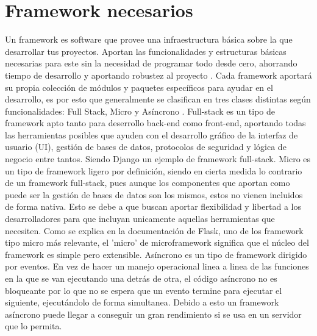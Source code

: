 \section{Framework necesarios}
Un framework es software que provee una infraestructura básica sobre la que desarrollar tus proyectos. Aportan las funcionalidades y estructuras básicas necesarias para este sin la necesidad de programar todo desde cero, ahorrando tiempo de desarrollo y aportando robustez al proyecto \cite{ghimire2020comparative}.
\newline
\newline
Cada framework aportará su propia colección de módulos y paquetes específicos para ayudar en el desarrollo, es por esto que generalmente se clasifican en tres clases distintas según funcionalidades: Full Stack, Micro y Asíncrono \cite{WebFra}.\newline
\newline
Full-stack es un tipo de framework apto tanto para deserrollo back-end como front-end, aportando todas las herramientas posibles que ayuden con el desarrollo gráfico de la interfaz de usuario (UI), gestión de bases de datos, protocolos de seguridad y lógica de negocio entre tantos. Siendo Django un ejemplo de framework full-stack. 
\newline
\newline
Micro es un tipo de framework ligero por definición, siendo en cierta medida lo contrario de un framework full-stack, pues aunque los componentes que aportan como puede ser la gestión de bases de datos son los mismos, estos no vienen incluidos de forma nativa. Esto se debe a que buscan aportar flexibilidad y libertad a los desarrolladores para que incluyan unicamente aquellas herramientas que necesiten. Como se explica en la documentación de Flask, uno de los framework tipo micro más relevante, el 'micro' de microframework significa que el núcleo del framework es simple pero extensible.
\newline
\newline
Asíncrono es un tipo de framework dirigido por eventos. En vez de hacer un manejo operacional linea a linea de las funciones en la que se van ejecutando una detrás de otra, el código asíncrono no es bloqueante por lo que no se espera que un evento termine para ejecutar el siguiente, ejecutándolo de forma simultanea. Debido a esto un framework asíncrono puede llegar a conseguir un gran rendimiento si se usa en un servidor que lo permita.

